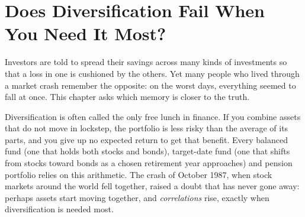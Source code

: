 \makeatletter
{}
\makeatother

\makeatletter
\makeatother

\chapter{Does Diversification Fail When You Need It Most?}
\label{ch:10}
\providecommand{\term}[1]{\emph{#1}}

Investors are told to spread their savings across many kinds of investments so that a loss in one is cushioned by the others. Yet many people who lived through a market crash remember the opposite: on the worst days, everything seemed to fall at once. This chapter asks which memory is closer to the truth.

Diversification is often called the only free lunch in finance. If you combine assets that do not move in lockstep, the portfolio is less risky than the average of its parts, and you give up no expected return to get that benefit. Every balanced fund (one that holds both stocks and bonds), target-date fund (one that shifts from stocks toward bonds as a chosen retirement year approaches) and pension portfolio relies on this arithmetic. The crash of October 1987, when stock markets around the world fell together, raised a doubt that has never gone away: perhaps assets start moving together, and \term{correlations} rise, exactly when diversification is needed most.

